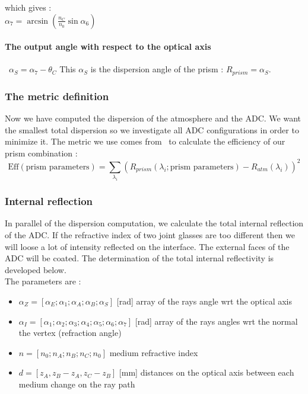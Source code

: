 which gives :\\

$\alpha_7 = \arcsin\left(\frac{n_C}{n_0}\sin\alpha_6\right) $\\

\paragraph*{The output angle with respect to the optical axis}\
$\alpha_S = \alpha_7-\theta_C$
This $\alpha_S$ is the dispersion angle of the prism : $R_{prism} = \alpha_S$.





\subsubsection{The metric definition}
Now we have computed the dispersion of the atmosphere and the ADC. We want the smallest total dispersion so we investigate all ADC configurations in order to minimize it. The metric we use comes from~\cite{Tendulkar} to calculate the efficiency of our prism combination :
\begin{equation}
	\text{Eff}\left(\text{prism parameters}\right) = \sum_{\lambda_i}\left(R_{prism}\left(\lambda_i;\text{prism parameters}\right) - R_{atm}\left(\lambda_i\right)\right)^2
\end{equation}


\subsubsection{Internal reflection}
In parallel of the dispersion computation, we calculate the total internal reflection of the ADC. If the refractive index of two joint glasses are too different then we will loose a lot of intensity reflected on the interface. The external faces of the ADC will be coated. The determination of the total internal reflectivity is developed below.\\
The parameters are :
\begin{itemize}
	\item $\alpha_Z = [\alpha_E;\alpha_1;\alpha_A;\alpha_B;\alpha_S]$ [rad] array of the rays angle wrt the optical axis
	\item $\alpha_I = [\alpha_1;\alpha_2;\alpha_3;\alpha_4;\alpha_5;\alpha_6;\alpha_7]$ [rad] array of the rays angles wrt the normal the vertex (refraction angle)
	\item $n = [n_0;n_A;n_B;n_C;n_0]$ medium refractive index
	\item $d = [z_A,z_B-z_A,z_C-z_B]$ [mm] distances on the optical axis between each medium change on the ray path
\end{itemize}

